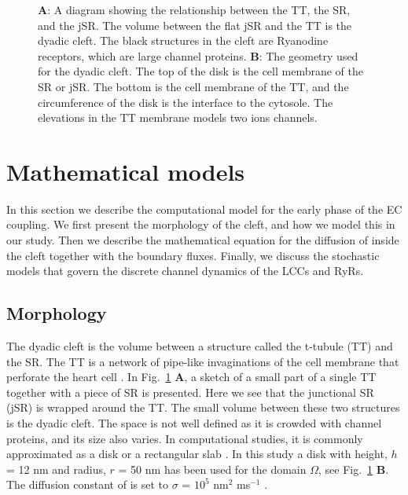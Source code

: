 \begin{figure}[t]
\begin{minipage}[t]{0.64\linewidth}
  \end{minipage}
  \caption{\textbf{A}: A diagram showing the relationship between the TT, the SR, and the jSR. The volume between the flat jSR and the TT is the dyadic cleft. The black structures in the cleft are Ryanodine receptors, which are large channel proteins. \textbf{B}: The geometry used for the dyadic cleft. The top of the disk is the cell membrane of the SR or jSR. The bottom is the cell membrane of the TT, and the circumference of the disk is the interface to the cytosole. The elevations in the TT membrane models two ions channels.}
\label{fig:morphology}
\end{figure}

\section{Mathematical models}
\label{sec:mathematical-models}
In this section we describe the computational model for the early phase of the EC coupling. We first present the morphology of the cleft, and how we model this in our study. Then we describe the mathematical equation for the diffusion of \Ca inside the cleft together with the boundary fluxes. Finally, we discuss the stochastic models that govern the discrete channel dynamics of the LCCs and RyRs.\par

\subsection*{Morphology}
\label{sec:morphology}
The dyadic cleft is the volume between a structure called the t-tubule (TT) and the SR. The TT is a network of pipe-like invaginations of the cell membrane that perforate the heart cell \cite{SoellerCannell1999}. In Fig.~\ref{fig:morphology} \textbf{A}, a sketch of a small part of a single TT together with a piece of SR is presented. Here we see that the junctional SR (jSR) is wrapped around the TT. The small volume between these two structures is the dyadic cleft. The space is not well defined as it is crowded with channel proteins, and its size also varies. In computational studies, it is commonly approximated as a disk or a rectangular slab \cite{PeskoffPostEtAl1992,SoellerCannell1997,KohSrinivasanEtAl2006,TanskanenGreensteinEtAl2007}. In this study a disk with height, $h$ = 12 nm and radius, $r$ = 50 nm has been used for the domain $\Omega$, see Fig.~\ref{fig:morphology} \textbf{B}. The diffusion constant of \Ca is set to $\sigma$ = $10^5$ nm$^2$ ms$^{-1}$ \cite{LangerPeskoff1996}.\par

